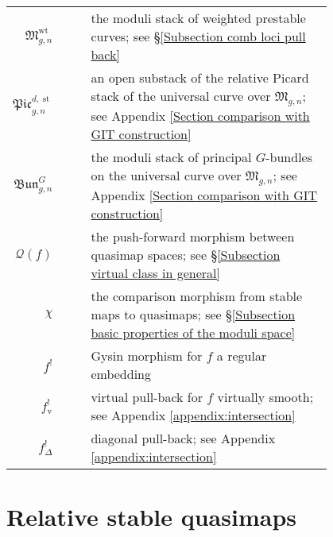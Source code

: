 \documentclass[11pt]{amsart}
\newcommand{\MM}{\mathfrak M}
\newcommand{\om}[1]{\mathcal{#1}}
\theoremstyle{definition}
\theoremstyle{definition}
\begin{document}
\begin{longtabu}{r c c p{0.8\linewidth}}
$\MM^{\operatorname{wt}}_{g,n}$ & & & the moduli stack of weighted prestable curves; see \S \ref{Subsection comb loci pull back} \\
$\mathfrak{Pic}_{g,n}^{d,\operatorname{st}}$ & & & an open substack of the relative Picard stack of the universal curve over $\MM_{g,n}$; see Appendix \ref{Section comparison with GIT construction} \\
$\mathfrak{Bun}^{G}_{g,n}$ & & & the moduli stack of principal $G$-bundles on the universal curve over $\MM_{g,n}$; see Appendix \ref{Section comparison with GIT construction} \\
$\om{Q}(f)$ & & & the push-forward morphism between quasimap spaces; see \S \ref{Subsection virtual class in general} \\
$\chi$ & & & the comparison morphism from stable maps to quasimaps; see \S \ref{Subsection basic properties of the moduli space} \\
$f^!$ & & & Gysin morphism for $f$ a regular embedding \\
$f^!_{\text{v}}$ & & & virtual pull-back for $f$ virtually smooth; see Appendix \ref{appendix:intersection} \\
$f^!_{\Delta}$ & & & diagonal pull-back; see Appendix \ref{appendix:intersection}
\end{longtabu}

\section{Relative stable quasimaps} \label{Section relative stable quasimaps}
\end{document}

